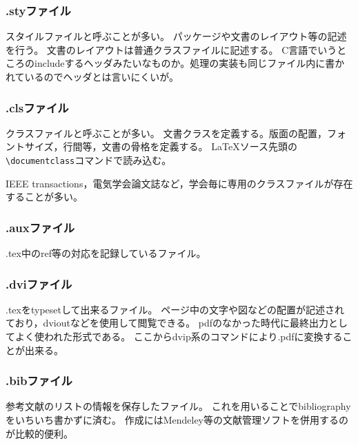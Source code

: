 \documentclass[10pt,a4paper,oneside,twocolumn,fleqn,dvipdfmx]{jsarticle}
\begin{document}
\subsubsection*{.styファイル}
スタイルファイルと呼ぶことが多い。
パッケージや文書のレイアウト等の記述を行う。
文書のレイアウトは普通クラスファイルに記述する。
C言語でいうところのincludeするヘッダみたいなものか。処理の実装も同じファイル内に書かれているのでヘッダとは言いにくいが。

\subsubsection*{.clsファイル}
クラスファイルと呼ぶことが多い。
文書クラスを定義する。版面の配置，フォントサイズ，行間等，文書の骨格を定義する。
\LaTeX ソース先頭の\verb|\documentclass|コマンドで読み込む。

IEEE transactions，電気学会論文誌など，学会毎に専用のクラスファイルが存在することが多い。

\subsubsection*{.auxファイル}
.tex中のref等の対応を記録しているファイル。

\subsubsection*{.dviファイル}
.texをtypesetして出来るファイル。
ページ中の文字や図などの配置が記述されており，dvioutなどを使用して閲覧できる。
pdfのなかった時代に最終出力としてよく使われた形式である。
ここからdvip系のコマンドにより.pdfに変換することが出来る。

\subsubsection*{.bibファイル}
参考文献のリストの情報を保存したファイル。
これを用いることでbibliographyをいちいち書かずに済む。
作成にはMendeley等の文献管理ソフトを併用するのが比較的便利。
\end{document}
